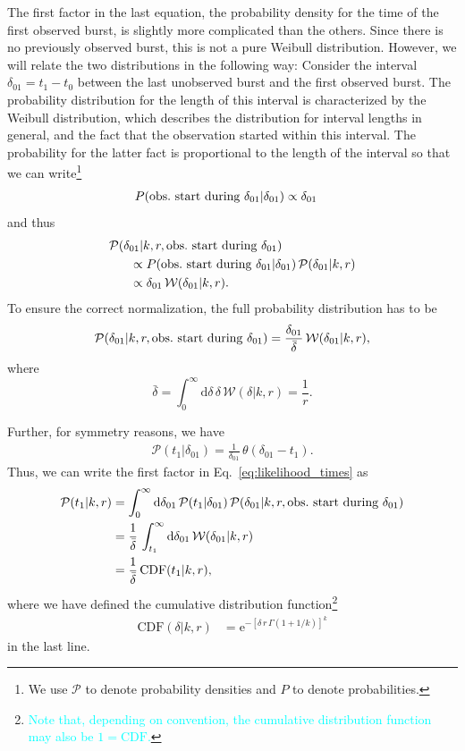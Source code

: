 \documentclass[fleqn,usenatbib]{mnras}
\newcommand{\new}[1]{\textcolor{cyan}{#1}}
\renewcommand{\d}{\delta}
\begin{document}
The first factor in the last equation, the probability density for the time of the first observed burst, is slightly more complicated than the others. Since there is no previously observed burst, this is not a pure Weibull distribution. However, we will relate the two distributions in the following way: Consider the interval $\d_{01} = t_1 - t_0$ between the last unobserved burst and the first observed burst. The probability distribution for the length of this interval is characterized by the Weibull distribution, which describes the distribution for interval lengths in general, and the fact that the observation started within this interval. The probability for the latter fact is proportional to the length of the interval so that we can write\footnote{We use $\mathcal{P}$ to denote probability densities and $P$ to denote probabilities.}
\begin{align}
	P(\textnormal{obs.\ start during }\d_{01} | \d_{01}) &\propto \d_{01}
\end{align}
and thus
\begin{align}
	&\mathcal{P}(\d_{01}|k,r,\textnormal{obs.\ start during }\d_{01})\nonumber\\
	&~~~~~\propto P(\textnormal{obs.\ start during }\d_{01}|\d_{01}) \, \mathcal{P}(\d_{01}|k,r)\nonumber\\
	&~~~~~\propto \d_{01} \, \mathcal{W}(\d_{01}|k,r).
\end{align}
To ensure the correct normalization, the full probability distribution has to be
\begin{align}
	\mathcal{P}(\d_{01}|k,r,\textnormal{obs.\ start during }\d_{01}) = \frac{\d_{01}}{\bar{\d}} \, \mathcal{W}(\d_{01}|k,r),
\end{align}
where
\begin{equation}
	\label{eq:dbar_weibull}
	\bar{\d} = \int_0^\infty \mathrm{d}\d \, \d \, \mathcal{W}(\d|k,r) = \frac{1}{r}.
\end{equation}

Further, for symmetry reasons, we have
\begin{align}
 \mathcal{P}(t_1|\d_{01}) = \frac{1}{\d_{01}} \, \theta(\d_{01} - t_1).
\end{align}
Thus, we can write the first factor in Eq.~\eqref{eq:likelihood_times} as
\begin{align}
	\mathcal{P}(t_1|k,r) &= \int_0^\infty \mathrm{d}\d_{01} \, \mathcal{P}(t_1|\d_{01}) \, \mathcal{P}(\d_{01}|k,r,\textnormal{obs.\ start during }\d_{01})\nonumber\\
	&= \frac{1}{\bar{\d}} \, \int_{t_1}^\infty \mathrm{d}\d_{01} \, \mathcal{W}(\d_{01}|k,r)\nonumber\\
	&= \frac{1}{\bar{\d}} \, \mathrm{CDF}(t_1|k,r),
\end{align}
where we have defined the cumulative distribution function\footnote{\new{Note that, depending on convention, the cumulative distribution function may also be $1 = \mathrm{CDF}$.}}
\begin{align}
	\label{eq:cdf_weibull}
	\mathrm{CDF}(\d|k,r) &= \mathrm{e}^{-\left[\d\,r\,\Gamma(1 + 1/k)\right]^k}
\end{align}
in the last line.
\end{document}
